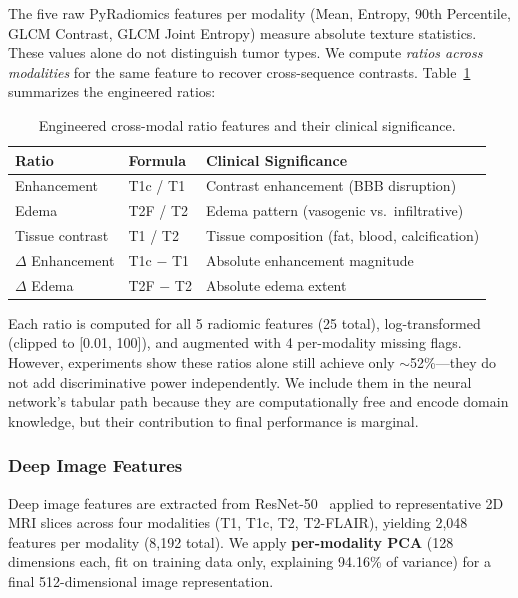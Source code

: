 The five raw PyRadiomics features per modality (Mean, Entropy, 90th Percentile, GLCM Contrast, GLCM Joint Entropy) measure absolute texture statistics. These values alone do not distinguish tumor types. We compute \emph{ratios across modalities} for the same feature to recover cross-sequence contrasts. Table~\ref{tab:ratios} summarizes the engineered ratios:

\begin{table}[H]
\centering
\caption{Engineered cross-modal ratio features and their clinical significance.}
\label{tab:ratios}
\begin{tabular}{lll}
\toprule
\textbf{Ratio} & \textbf{Formula} & \textbf{Clinical Significance} \\
\midrule
Enhancement & T1c / T1 & Contrast enhancement (BBB disruption) \\
Edema & T2F / T2 & Edema pattern (vasogenic vs.\ infiltrative) \\
Tissue contrast & T1 / T2 & Tissue composition (fat, blood, calcification) \\
$\Delta$ Enhancement & T1c $-$ T1 & Absolute enhancement magnitude \\
$\Delta$ Edema & T2F $-$ T2 & Absolute edema extent \\
\bottomrule
\end{tabular}
\end{table}

Each ratio is computed for all 5 radiomic features (25 total), log-transformed (clipped to [0.01, 100]), and augmented with 4 per-modality missing flags. However, experiments show these ratios alone still achieve only $\sim$52\%---they do not add discriminative power independently. We include them in the neural network's tabular path because they are computationally free and encode domain knowledge, but their contribution to final performance is marginal.

\subsubsection{Deep Image Features}

Deep image features are extracted from ResNet-50~\cite{he2016} applied to representative 2D MRI slices across four modalities (T1, T1c, T2, T2-FLAIR), yielding 2,048 features per modality (8,192 total). We apply \textbf{per-modality PCA} (128 dimensions each, fit on training data only, explaining 94.16\% of variance) for a final 512-dimensional image representation.

